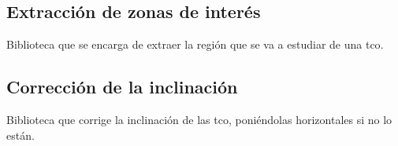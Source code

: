 \subsection{Extracción de zonas de interés}
Biblioteca que se encarga de extraer la región que se va a estudiar de
una \gls{tco}.

\subsection{Corrección de la inclinación}
Biblioteca que corrige la inclinación de las \gls{tco}, poniéndolas
horizontales si no lo están.

